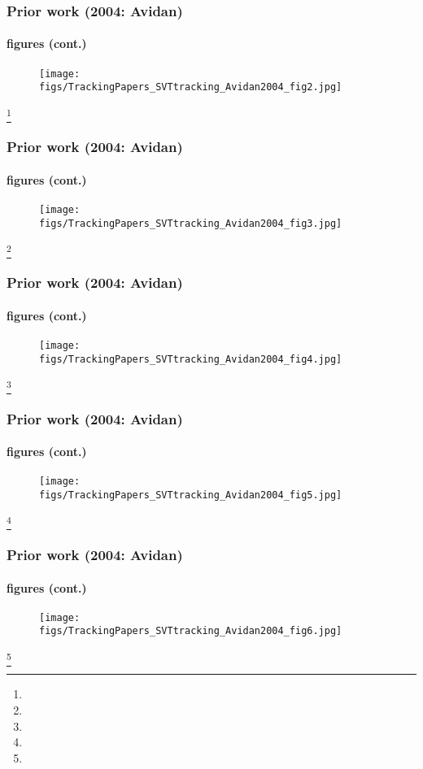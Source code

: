 \begin{frame}
\frametitle{Prior work (2004: Avidan)}
\framesubtitle{figures (cont.)}
\logoCSIPCPL\mypagenum
	\begin{figure}
		\texttt{[image: figs/TrackingPapers\_SVTtracking\_Avidan2004\_fig2.jpg]}
	\end{figure}
\footnote{\tiny {}}
\end{frame}


\begin{frame}
\frametitle{Prior work (2004: Avidan)}
\framesubtitle{figures (cont.)}
\logoCSIPCPL\mypagenum
	\begin{figure}
		\texttt{[image: figs/TrackingPapers\_SVTtracking\_Avidan2004\_fig3.jpg]}
	\end{figure}
\footnote{\tiny {}}
\end{frame}


\begin{frame}
\frametitle{Prior work (2004: Avidan)}
\framesubtitle{figures (cont.)}
\logoCSIPCPL\mypagenum
	\begin{figure}
		\texttt{[image: figs/TrackingPapers\_SVTtracking\_Avidan2004\_fig4.jpg]}
	\end{figure}
\footnote{\tiny {}}
\end{frame}


\begin{frame}
\frametitle{Prior work (2004: Avidan)}
\framesubtitle{figures (cont.)}
\logoCSIPCPL\mypagenum
	\begin{figure}
		\texttt{[image: figs/TrackingPapers\_SVTtracking\_Avidan2004\_fig5.jpg]}
	\end{figure}
\footnote{\tiny {}}
\end{frame}




\begin{frame}
\frametitle{Prior work (2004: Avidan)}
\framesubtitle{figures (cont.)}
\logoCSIPCPL\mypagenum
	\begin{figure}
		\texttt{[image: figs/TrackingPapers\_SVTtracking\_Avidan2004\_fig6.jpg]}
	\end{figure}
\footnote{\tiny {}}
\end{frame}


